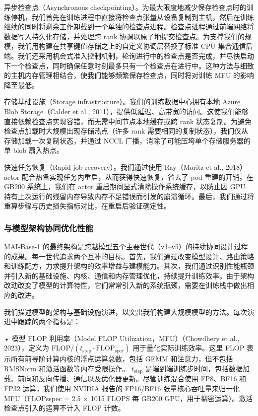 \documentclass[
  10
]{article}
\begin{document}
异步检查点（Asynchronous checkpointing）。为最大限度地减少保存检查点时的训练停机，我们首先在训练进程中直接将检查点张量从设备复制到主机，然后在训练继续的同时将剩余工作卸载到一个单独的检查点进程。检查点进程通过前端网络将数据写入持久化存储，并处理跨 rank 协调以原子地提交检查点。为支撑我们的规模，我们用构建在共享键值存储之上的自定义协调层替换了标准 CPU 集合通信后端。我们还采用机会式准入控制机制，轮询进行中的检查点是否完成，并尽快启动下一个检查点，同时确保任意时刻最多只有一个检查点在进行中。这种方法与细致的主机内存管理相结合，使我们能够频繁保存检查点，同时将对训练 MFU 的影响降至最低。



存储基础设施（Storage infrastructure）。我们的训练数据中心拥有本地 Azure Blob Storage（Calder et al., 2011），提供低延迟、高带宽的访问。这使我们能够直接依赖检查点实现容错，而无需中间节点本地缓存或跨 rank 状态复制。为避免检查点加载时大规模出现存储热点（许多 rank 需要相同的复制状态），我们仅从存储加载一次复制状态，并通过 NCCL 广播，消除了可能压垮单个存储服务器的单 blob 扇入热点。

快速任务恢复（Rapid job recovery）。我们通过使用 Ray（Moritz et al., 2018）actor 配合热备实现任务内重启，从而获得快速恢复，省去了 pod 重建的开销。在 GB200 系统上，我们在 actor 重启期间显式清除操作系统缓存，以防止因 GPU 持有上次运行的残留内存导致内存不足错误而引发的崩溃循环。最后，我们通过将重算步骤与历史损失指标对比，在重启后验证确定性。

\subsubsection{与模型架构协同优化性能}\label{cooptimizing-performance-with-model-architecture}

MAI-Base-1 的最终架构是跨越模型五个主要世代（v1--v5）的持续协同设计过程的成果。每一世代追求两个互补的目标。首先，我们通过改变模型设计、路由策略和训练配方，力求提升架构的效率增益与建模能力。其次，我们通过识别性能瓶颈并引入新的基础设施、内核、通信和内存管理优化，持续提升训练效率。由于架构改动改变了模型的计算特性，它们常常引入新的系统瓶颈，需要在训练栈中做出相应的改进。

我们描述模型的架构与基础设施演进，以突出我们构建大规模模型的方法。每次演进中跟踪的两个指标是：

• 模型 FLOP 利用率（Model FLOP Utilization，MFU）（Chowdhery et al., 2023），定义为
\(\mathrm { F L O P } / ( t _ { \mathrm { s t e p } } { \cdot } \mathrm { F L O P } _ { \mathrm { s p e c } } )\)
用于量化实际训练效率。这里 FLOP 表示所有前导阶计算内核的浮点运算总数，包括 GEMM 和注意力，但不包括 RMSNorm 和激活函数等内存受限操作。
\(t _ { \mathrm { s t e p } }\) 是端到端训练步时间，包括数据加载、前向和反向传播、通信以及优化器更新。尽管训练混合使用 FP8、BF16 和 FP32 运算，我们使用 NVIDIA 报告的 FP16/BF16 张量核心吞吐量来归一化 MFU（FLOPsspec = 2.5 $\times$ 1015 FLOPS 每 GB200 GPU，用于稠密运算）。激活检查点引入的运算不计入 FLOP 计数。
\end{document}
